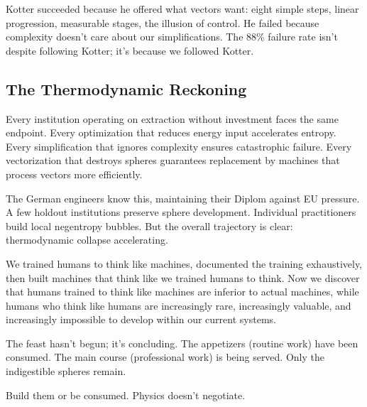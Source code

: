 Kotter succeeded because he offered what vectors want: eight simple steps, linear progression, measurable stages, the illusion of control. He failed because complexity doesn't care about our simplifications. The 88\% failure rate isn't despite following Kotter; it's because we followed Kotter.

\subsection{The Thermodynamic Reckoning}

Every institution operating on extraction without investment faces the same endpoint. Every optimization that reduces energy input accelerates entropy. Every simplification that ignores complexity ensures catastrophic failure. Every vectorization that destroys spheres guarantees replacement by machines that process vectors more efficiently.

The German engineers know this, maintaining their Diplom against EU pressure. A few holdout institutions preserve sphere development. Individual practitioners build local negentropy bubbles. But the overall trajectory is clear: thermodynamic collapse accelerating.

We trained humans to think like machines, documented the training exhaustively, then built machines that think like we trained humans to think. Now we discover that humans trained to think like machines are inferior to actual machines, while humans who think like humans are increasingly rare, increasingly valuable, and increasingly impossible to develop within our current systems.

The feast hasn't begun; it's concluding. The appetizers (routine work) have been consumed. The main course (professional work) is being served. Only the indigestible spheres remain.

Build them or be consumed. Physics doesn't negotiate.
